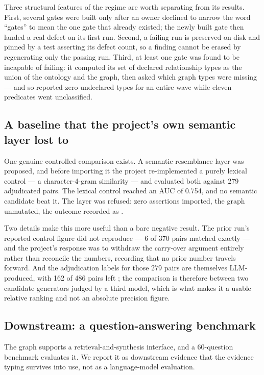 Three structural features of the regime are worth separating from its results.
First, several gates were built only after an owner declined to narrow the word
``gates'' to mean the one gate that already existed; the newly built gate then landed
a real defect on its first run. Second, a failing run is preserved on disk and pinned
by a test asserting its defect count, so a finding cannot be erased by regenerating
only the passing run. Third, at least one gate was found to be incapable of failing:
it computed its set of declared relationship types as the union of the ontology and
the graph, then asked which graph types were missing --- and so reported zero
undeclared types for an entire wave while eleven predicates went unclassified.

\subsection{A baseline that the project's own semantic layer lost to}
\label{sec:eval-baseline}

One genuine controlled comparison exists. A semantic-resemblance layer was proposed,
and before importing it the project re-implemented a purely lexical control --- a
character-4-gram similarity --- and evaluated both against 279 adjudicated pairs. The
lexical control reached an \mbox{AUC} of 0.754, and no semantic candidate beat it.
The layer was refused: zero assertions imported, the graph unmutated, the outcome
recorded as .

Two details make this more useful than a bare negative result. The prior run's
reported control figure did not reproduce --- 6 of 370 pairs matched exactly --- and
the project's response was to withdraw the carry-over argument entirely rather than
reconcile the numbers, recording that no prior number travels forward. And the
adjudication labels for those 279 pairs are themselves \mbox{LLM}-produced, with 162
of 486 pairs left ; the comparison is therefore
between two candidate generators judged by a third model, which is what makes it a
usable relative ranking and not an absolute precision figure.

\subsection{Downstream: a question-answering benchmark}
\label{sec:eval-ask}

The graph supports a retrieval-and-synthesis interface, and a 60-question benchmark
evaluates it. We report it as downstream evidence that the evidence typing survives
into use, not as a language-model evaluation.

